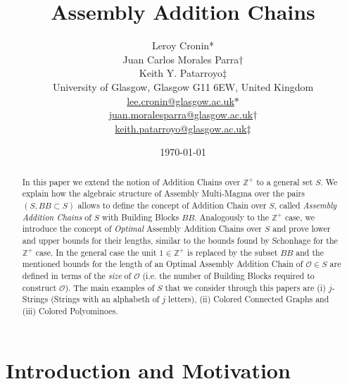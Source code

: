 \documentclass[letterpaper,12pt]{article}
\title{Assembly Addition Chains}
\author{Leroy Cronin* \\ Juan Carlos Morales Parra$\dagger$ \\ Keith Y. Patarroyo$\ddagger$  \\  
\small{University of Glasgow, Glasgow G11 6EW, United Kingdom} \\ 
\small{\url{lee.cronin@glasgow.ac.uk}}$*$ \\ \small{\url{juan.moralesparra@glasgow.ac.uk}}$\dagger$  \\ \small{\url{keith.patarroyo@glasgow.ac.uk}}$\ddagger$ 
\date{\today}}
\theoremstyle{definition}
\begin{document}
\maketitle
\begin{abstract} 
\noindent
In this paper we extend the notion of Addition Chains over $\mathbb{Z}^+$ to a general set $S$. We explain how the algebraic structure of Assembly Multi-Magma over the pairs $(S,BB\subset S)$ allows to define the concept of Addition Chain over $S$, called \textit{Assembly Addition Chains} of $S$ with Building Blocks $BB$. Analogously to the $\mathbb{Z}^+$ case, we introduce the concept of \textit{Optimal} Assembly Addition Chains over $S$ and prove lower and upper bounds for their lengths, similar to the bounds found by Schonhage for the $\mathbb{Z}^+$ case. In the general case the unit $1 \in \mathbb{Z}^+$ is replaced by the subset $BB$ and the mentioned bounds for the length of an Optimal Assembly Addition Chain of $ \mathscr{O} \in S$ are defined in terms of the \textit{size} of $\mathscr{O}$ (i.e. the number of Building Blocks required to construct $\mathscr{O}$). The main examples of $S$ that we consider through this papers are (i) $j$-Strings (Strings with an alphabeth of $j$ letters), (ii) Colored Connected Graphs and (iii) Colored Polyominoes. 
\end{abstract}


\section{Introduction and Motivation}
\end{document}
